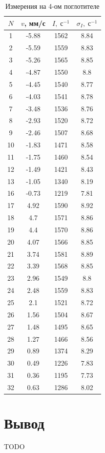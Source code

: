 \documentclass[12pt]{kiarticle}
\begin{document}
	\begin{table}[h]
		\caption{Измерения на 4-ом поглотителе}
		\begin{center}
			\begin{tabular}{|c|c|c|c|}
				\hline
				$ N  $ & $ v $, мм/с &  $ I, \; с^{-1} $ & $ \sigma_I, \; с^{-1} $  \\
				\hline
				1 & -5.88 & 1562 & 8.84 \\
				2 & -5.59 & 1559 & 8.83 \\
				3 & -5.26 & 1565 & 8.85 \\
				4 & -4.87 & 1550 & 8.8 \\
				5 & -4.45 & 1540 & 8.77 \\
				6 & -4.03 & 1541 & 8.78 \\
				7 & -3.48 & 1536 & 8.76 \\
				8 & -2.93 & 1520 & 8.72 \\
				9 & -2.46 & 1507 & 8.68 \\
				10 & -1.83 & 1471 & 8.58 \\
				11 & -1.75 & 1460 & 8.54 \\
				12 & -1.49 & 1421 & 8.43 \\
				13 & -1.05 & 1340 & 8.19 \\
				16 & -0.73 & 1219 & 7.81 \\
				17 & 4.92 & 1590 & 8.92 \\
				18 & 4.7 & 1571 & 8.86 \\
				19 & 4.4 & 1570 & 8.86 \\
				20 & 4.07 & 1566 & 8.85 \\
				21 & 3.74 & 1581 & 8.89 \\
				22 & 3.39 & 1568 & 8.85 \\
				23 & 2.96 & 1549 & 8.8 \\
				24 & 2.48 & 1559 & 8.83 \\
				25 & 2.1 & 1521 & 8.72 \\
				26 & 1.56 & 1504 & 8.67 \\
				27 & 1.48 & 1495 & 8.65 \\
				28 & 1.27 & 1466 & 8.56 \\
				29 & 0.89 & 1374 & 8.29 \\
				30 & 0.49 & 1226 & 7.83 \\
				31 & 0.36 & 1195 & 7.73 \\
				32 & 0.63 & 1286 & 8.02 \\
				\hline
			\end{tabular}
		\end{center}
		\label{table_4}
	\end{table}

	
	 
	
	\section{Вывод}
	
	TODO
	
\end{document}
